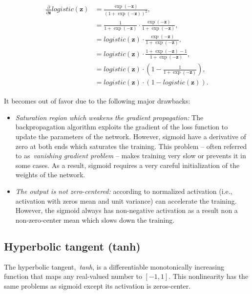 \begin{align}\label{eq:logistic_derivative}
\begin{split}%
    \frac{\partial}{\partial \mathbf{z}}logistic(\mathbf{z}) &=
        \frac{\exp(\mathbf{-z})}{\left(1+\exp(-\mathbf{z})\right)^2} ,\\
    &= \frac{1}{1+\exp(-\mathbf{z})} \cdot
        \frac{\exp(-\mathbf{z})}{1+\exp(-\mathbf{z})} ,\\
    &= logistic(\mathbf{z}) \cdot
        \frac{\exp(-\mathbf{z})}{1+\exp(-\mathbf{z})} ,\\
    &= logistic(\mathbf{z}) \cdot
        \frac{1+\exp(-\mathbf{z})-1}{1+\exp(-\mathbf{z})} ,\\
    &= logistic(\mathbf{z}) \cdot
        \left(1-\frac{1}{1+\exp(-\mathbf{z})}\right) ,\\
    &= logistic(\mathbf{z}) \cdot (1-logistic(\mathbf{z})).
\end{split}
\end{align}

It becomes out of favor due to the following major drawbacks:
\begin{itemize}
    \item \emph{Saturation region which weakens the gradient propagation:}
        The backpropagation algorithm exploits the gradient of the loss function to update the parameters of the network. 
        However, sigmoid have a derivative of zero at both ends which saturates the training. This problem -- often referred to as~\emph{vanishing gradient problem} -- makes training very slow or prevents it in some cases. As a result, sigmoid requires a very careful initialization of the weights of the network.
    \item \emph{The output is not zero-centered:} 
    according to \cite{ioffe2015batch} normalized activation (i.e., activation with zeros mean and unit variance) can accelerate the training. However, the sigmoid always has non-negative activation as a result non a non-zero-center mean which slows down the training.
\end{itemize}

\subsection{Hyperbolic tangent (tanh)}\label{sec:tanh}

The hyperbolic tangent,~\emph{tanh}, is a differentiable monotonically increasing function that maps any real-valued number to $[-1, 1]$. This nonlinearity has the same problems as sigmoid except its activation is zeros-center.


